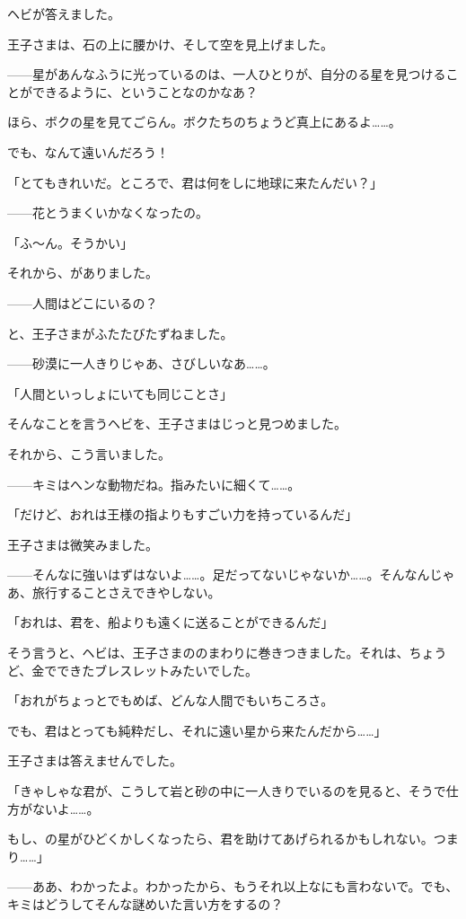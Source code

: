 ヘビが答えました。

王子さまは、石の上に腰かけ、そして空を見上げました。

——星があんなふうに光っているのは、一人ひとりが、自分のる星を見つけることができるように、ということなのかなあ？

ほら、ボクの星を見てごらん。ボクたちのちょうど真上にあるよ……。

でも、なんて遠いんだろう！

「とてもきれいだ。ところで、君は何をしに地球に来たんだい？」

——花とうまくいかなくなったの。

「ふ～ん。そうかい」

それから、がありました。


——人間はどこにいるの？

と、王子さまがふたたびたずねました。

——砂漠に一人きりじゃあ、さびしいなあ……。

「人間といっしょにいても同じことさ」

そんなことを言うヘビを、王子さまはじっと見つめました。

それから、こう言いました。

——キミはへンな動物だね。指みたいに細くて……。

「だけど、おれは王様の指よりもすごい力を持っているんだ」

王子さまは微笑みました。

——そんなに強いはずはないよ……。足だってないじゃないか……。そんなんじゃあ、旅行することさえできやしない。

「おれは、君を、船よりも遠くに送ることができるんだ」

そう言うと、ヘビは、王子さまののまわりに巻きつきました。それは、ちょうど、金でできたブレスレットみたいでした。

「おれがちょっとでもめば、どんな人間でもいちころさ。

でも、君はとっても純粋だし、それに遠い星から来たんだから……」

王子さまは答えませんでした。

「きゃしゃな君が、こうして岩と砂の中に一人きりでいるのを見ると、そうで仕方がないよ……。

もし、の星がひどくかしくなったら、君を助けてあげられるかもしれない。つまり……」

——ああ、わかったよ。わかったから、もうそれ以上なにも言わないで。でも、キミはどうしてそんな謎めいた言い方をするの？


